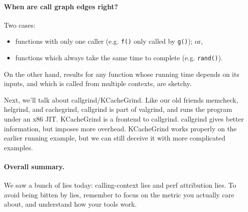 \paragraph{When are call graph edges right?}
Two cases:
\vspace*{-1em}
    \begin{itemize}[noitemsep]
    \item functions with only one caller
      (e.g. {\tt f()} only called by {\tt g()}); or,
    \item functions which always take the same time to complete
      (e.g. {\tt rand()}).
    \end{itemize}
\vspace*{-1em}

On the other hand, results for any function whose running time depends on its inputs,
and which is called from multiple contexts, are sketchy.


Next, we'll talk about callgrind/KCacheGrind. Like our old friends memcheck, helgrind, and cachegrind, callgrind is part of valgrind, and runs the program under an x86 JIT.  KCacheGrind is a frontend to callgrind. callgrind gives better information, but imposes
more overhead.
KCacheGrind works properly on the earlier running example, but we can still deceive it with more complicated examples.




\paragraph{Overall summary.} We saw a bunch of lies today: calling-context lies and perf attribution
lies. To avoid being bitten by lies, remember to focus on the metric you actually care about,
and understand how your tools work.






